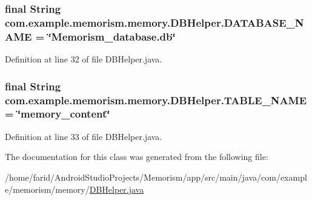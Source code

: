 \subsubsection[{\texorpdfstring{D\+A\+T\+A\+B\+A\+S\+E\+\_\+\+N\+A\+ME}{DATABASE_NAME}}]{\setlength{\rightskip}{0pt plus 5cm}final String com.\+example.\+memorism.\+memory.\+D\+B\+Helper.\+D\+A\+T\+A\+B\+A\+S\+E\+\_\+\+N\+A\+ME = \char`\"{}Memorism\+\_\+database.\+db\char`\"{}\hspace{0.3cm}{\ttfamily [static]}}\hypertarget{classcom_1_1example_1_1memorism_1_1memory_1_1_d_b_helper_a61a19ee13881d07c502373a34687d671}{}\label{classcom_1_1example_1_1memorism_1_1memory_1_1_d_b_helper_a61a19ee13881d07c502373a34687d671}


Definition at line 32 of file D\+B\+Helper.\+java.

\subsubsection[{\texorpdfstring{T\+A\+B\+L\+E\+\_\+\+N\+A\+ME}{TABLE_NAME}}]{\setlength{\rightskip}{0pt plus 5cm}final String com.\+example.\+memorism.\+memory.\+D\+B\+Helper.\+T\+A\+B\+L\+E\+\_\+\+N\+A\+ME = \char`\"{}memory\+\_\+content\char`\"{}\hspace{0.3cm}{\ttfamily [static]}}\hypertarget{classcom_1_1example_1_1memorism_1_1memory_1_1_d_b_helper_afb514eee57c4fe21a7c1b7c9c72747a0}{}\label{classcom_1_1example_1_1memorism_1_1memory_1_1_d_b_helper_afb514eee57c4fe21a7c1b7c9c72747a0}


Definition at line 33 of file D\+B\+Helper.\+java.



The documentation for this class was generated from the following file\+:\begin{DoxyCompactItemize}
\item 
/home/farid/\+Android\+Studio\+Projects/\+Memorism/app/src/main/java/com/example/memorism/memory/\hyperlink{_d_b_helper_8java}{D\+B\+Helper.\+java}\end{DoxyCompactItemize}
